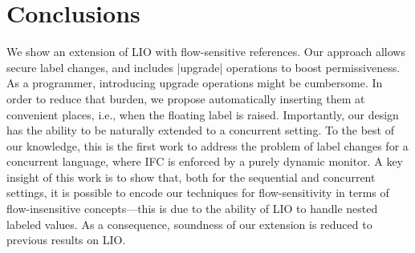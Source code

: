 \section{Conclusions}
\label{sec:conclusion}

We show an extension of LIO with flow-sensitive references. Our approach allows
secure label changes, and includes |upgrade| operations to boost
permissiveness. As a programmer, introducing upgrade operations might be
cumbersome. In order to reduce that burden, we propose automatically inserting
them at convenient places, i.e., when the floating label is raised.
Importantly, our design has the ability to be naturally extended to a
concurrent setting.  To the best of our knowledge, this is the first work to
address the problem of label changes for a concurrent language, where IFC is
enforced by a purely dynamic monitor.  A key insight of this work is to show
that, both for the sequential and concurrent settings, it is possible to encode
our techniques for flow-sensitivity in terms of flow-insensitive
concepts---this is due to the ability of LIO to handle nested labeled values.
As a consequence, soundness of our extension is reduced to previous results on
LIO.


